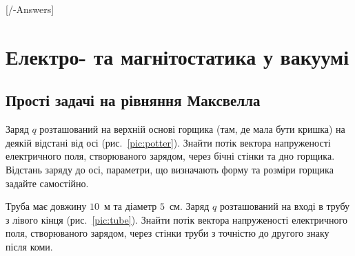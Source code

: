 
[\currfilebase/\currfilebase-Answers]
\chapter{Електро- та магнітостатика у вакуумі}\label{\currfilebase}

\section{Прості задачі на рівняння Максвелла}

\begin{problem}\label{prb:potter}
Заряд $q$ розташований на верхній основі горщика (там, де мала бути кришка) на деякій відстані від осі (рис.~\ref{pic:potter}). Знайти потік
вектора
напруженості електричного поля, створюваного зарядом, через бічні стінки та дно горщика. Відстань заряду до осі, параметри, що визначають
форму та
розміри горщика задайте самостійно.
\end{problem}

\begin{problem}\label{prb:tube}
Труба має довжину $10$~м та діаметр $5$~см. Заряд $q$ розташований на вході в трубу з лівого кінця (рис.~\ref{pic:tube}).
Знайти потік вектора напруженості електричного поля, створюваного зарядом, через стінки труби з точністю до другого знаку після коми.
\end{problem}

